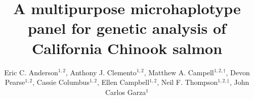 

\newcommand{\myTitle}{A multipurpose microhaplotype panel for genetic analysis of California Chinook salmon}
\title{\myTitle}

\newcommand{\myAuthors}{Eric C. Anderson$^{1,\S}$, Anthony J. Clemento$^{1,2}$, Matthew A. Campell$^{1,2\dagger}$, Devon Pearse$^{1,2}$, Cassie Columbus$^{1,2}$, Ellen Campbell$^{1,2}$, Neil F. Thompson$^{1,2\ddag}$, John Carlos Garza$^{1,2}$}
\author{Eric C. Anderson$^{1,2}$, Anthony J. Clemento$^{1,2}$, Matthew A. Campell$^{1,2,\dagger}$, Devon Pearse$^{1,2}$, Cassie Columbus$^{1,2}$, Ellen Campbell$^{1,2}$, Neil F. Thompson$^{1,2,\ddag}$, John Carlos Garza$^{1}$}


\newcommand{\myAffiliations}{
$^1$Southwest Fisheries Science Center, National Marine Fisheries Service, NOAA, Santa Cruz, California, USA. $^2$Institute for Marine Sciences, University of California, Santa Cruz, USA. $^\dagger$Current address: Centre for Carbon, Water and Food, The University of Sydney, 380 Werombi Road, NSW 2570, Australia. $^\ddag$Current address: Pacific Shellfish Breeding Center, Agricultural Research Service, US Department of Agriculture, Newport, Oregon, USA.
}

\renewcommand{\AuthorAddresses}{\myAffiliations}

\renewcommand{\KeyWords}{Genetic stock identfication, population assignment, parentage based tagging, amplicon sequencing}

\renewcommand{\CorrespondingAuthor}{eric.anderson@noaa.gov,~carlos.garza@noaa.gov}


\newcommand{\myEmailAddress}{eric.anderson@noaa.gov,~carlos.garza@noaa.gov}
\newcommand{\myEmailFootnote}{$^\S$}

\newcommand{\myCopyright}{\copyright US Federal Government work in the public domain in the USA}

\newcommand{\myRunningTitle}{Microhaplotypes for California Chinook salmon}
\renewcommand{\RunningTitle}{\myRunningTitle}

\newcommand{\myRunningAuthor}{Anderson et al.}

